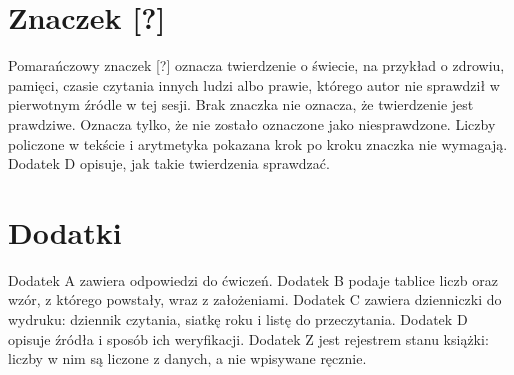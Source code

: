 \section*{Znaczek [?]}
Pomarańczowy znaczek [?] oznacza twierdzenie o świecie, na przykład o zdrowiu, pamięci, czasie
czytania innych ludzi albo prawie, którego autor nie sprawdził w pierwotnym źródle w tej sesji.
Brak znaczka nie oznacza, że twierdzenie jest prawdziwe. Oznacza tylko, że nie zostało oznaczone
jako niesprawdzone. Liczby policzone w tekście i arytmetyka pokazana krok po kroku znaczka nie
wymagają. Dodatek D opisuje, jak takie twierdzenia sprawdzać.

\section*{Dodatki}
Dodatek A zawiera odpowiedzi do ćwiczeń. Dodatek B podaje tablice liczb oraz wzór, z którego
powstały, wraz z założeniami. Dodatek C zawiera dzienniczki do wydruku: dziennik czytania, siatkę
roku i listę do przeczytania. Dodatek D opisuje źródła i sposób ich weryfikacji. Dodatek Z jest
rejestrem stanu książki: liczby w nim są liczone z danych, a nie wpisywane ręcznie.
